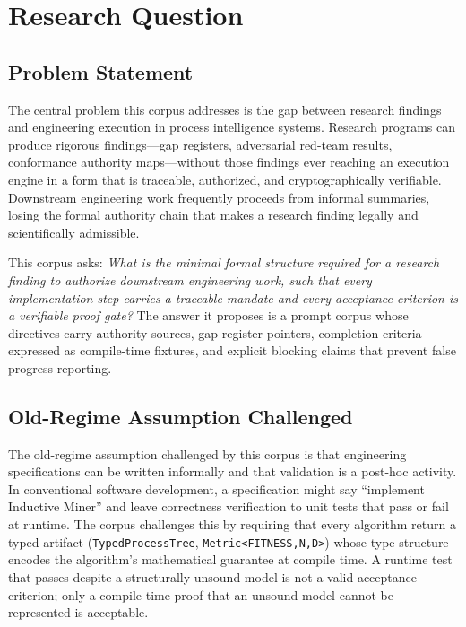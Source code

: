 
\section{Research Question}
\label{sec:prompts-question}

\subsection{Problem Statement}
\label{sec:prompts-question-problem}

The central problem this corpus addresses is the gap between research findings and
engineering execution in process intelligence systems. Research programs can produce
rigorous findings---gap registers, adversarial red-team results, conformance authority
maps---without those findings ever reaching an execution engine in a form that is
traceable, authorized, and cryptographically verifiable. Downstream engineering work
frequently proceeds from informal summaries, losing the formal authority chain that
makes a research finding legally and scientifically admissible.

This corpus asks: \emph{What is the minimal formal structure required for a research
finding to authorize downstream engineering work, such that every implementation step
carries a traceable mandate and every acceptance criterion is a verifiable proof gate?}
The answer it proposes is a prompt corpus whose directives carry authority sources,
gap-register pointers, completion criteria expressed as compile-time fixtures, and
explicit blocking claims that prevent false progress reporting.

\subsection{Old-Regime Assumption Challenged}
\label{sec:prompts-question-old-regime}

The old-regime assumption challenged by this corpus is that engineering specifications
can be written informally and that validation is a post-hoc activity. In conventional
software development, a specification might say ``implement Inductive Miner'' and
leave correctness verification to unit tests that pass or fail at runtime. The corpus
challenges this by requiring that every algorithm return a typed artifact
(\texttt{TypedProcessTree}, \texttt{Metric<FITNESS,N,D>}) whose type structure encodes
the algorithm's mathematical guarantee at compile time. A runtime test that passes
despite a structurally unsound model is not a valid acceptance criterion; only a
compile-time proof that an unsound model cannot be represented is acceptable.


